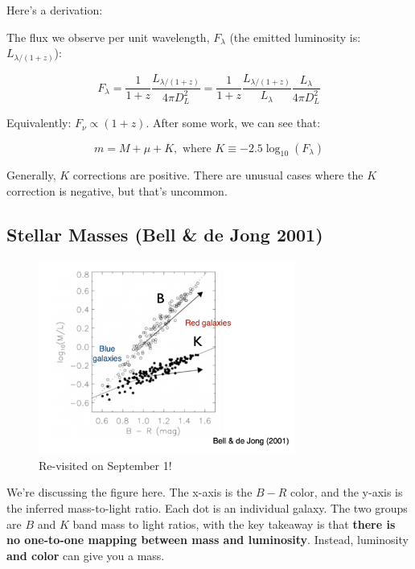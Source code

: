 \documentclass{article}
\newcommand{\be}{\begin{equation}}
\newcommand{\ee}{\end{equation}}
\begin{document}
Here's a derivation:

The flux we observe per unit wavelength, $F_\lambda$ (the emitted luminosity is: $L_{\lambda/(1+z)}$):

\begin{equation}
    F_\lambda = \frac{1}{1+z} \frac{L_{\lambda/(1+z)}}{4\pi D_L^2} = \frac{1}{1+z}\frac{L_{\lambda/(1+z)}}{L_\lambda} \frac{L_\lambda}{4\pi D_L^2}
\end{equation}

Equivalently: $F_\nu \propto (1+z)$. After some work, we can see that:

\be
    m = M + \mu + K, \text{ where } K \equiv -2.5\log_{10}\left(F_\lambda\right)
\ee

Generally, $K$ corrections are positive. There are unusual cases where the $K$ correction is negative, but that's uncommon. 

\subsection{Stellar Masses (Bell \& de Jong 2001)}

\begin{figure}[h!]
    \centering
    \includegraphics[width=0.75\textwidth]{figs/Screen Shot 2021-08-27 at 2.31.11 PM.png}
    \caption{Re-visited on September 1!}
    \label{fig:color_ml_21}
\end{figure}

We're discussing the figure here. The x-axis is the $B-R$ color, and the y-axis is the inferred mass-to-light ratio. Each dot is an individual galaxy. The two groups are $B$ and $K$ band mass to light ratios, with the key takeaway is that \textbf{there is no one-to-one mapping between mass and luminosity}. Instead, luminosity \textbf{and color} can give you a mass. 
\end{document}
